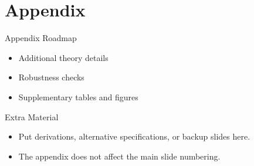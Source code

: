 \section{Appendix}

\begin{frame}{Appendix Roadmap}
  \begin{itemize}
    \item Additional theory details
    \item Robustness checks
    \item Supplementary tables and figures
  \end{itemize}
\end{frame}

\begin{frame}{Extra Material}
  \begin{itemize}
    \item Put derivations, alternative specifications, or backup slides here.
    \item The appendix does not affect the main slide numbering.
  \end{itemize}
\end{frame}
